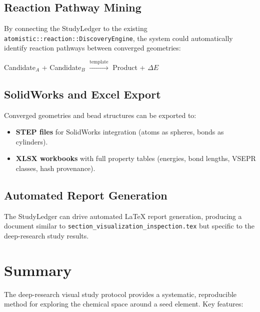 \documentclass[11pt,a4paper]{article}
\begin{document}
\subsection{Reaction Pathway Mining}

By connecting the StudyLedger to the existing
\texttt{atomistic::reaction::DiscoveryEngine}, the system could
automatically identify reaction pathways between converged geometries:

\begin{center}
Candidate$_A$ + Candidate$_B$ $\xrightarrow{\text{template}}$ Product + $\Delta E$
\end{center}

\subsection{SolidWorks and Excel Export}

Converged geometries and bead structures can be exported to:
\begin{itemize}
  \item \textbf{STEP files} for SolidWorks integration (atoms as spheres,
        bonds as cylinders).
  \item \textbf{XLSX workbooks} with full property tables (energies,
        bond lengths, VSEPR classes, hash provenance).
\end{itemize}

\subsection{Automated Report Generation}

The StudyLedger can drive automated LaTeX report generation, producing
a document similar to \texttt{section\_visualization\_inspection.tex}
but specific to the deep-research study results.

\section{Summary}
\label{sec:summary}

The deep-research visual study protocol provides a systematic,
reproducible method for exploring the chemical space around a seed
element.  Key features:
\end{document}
